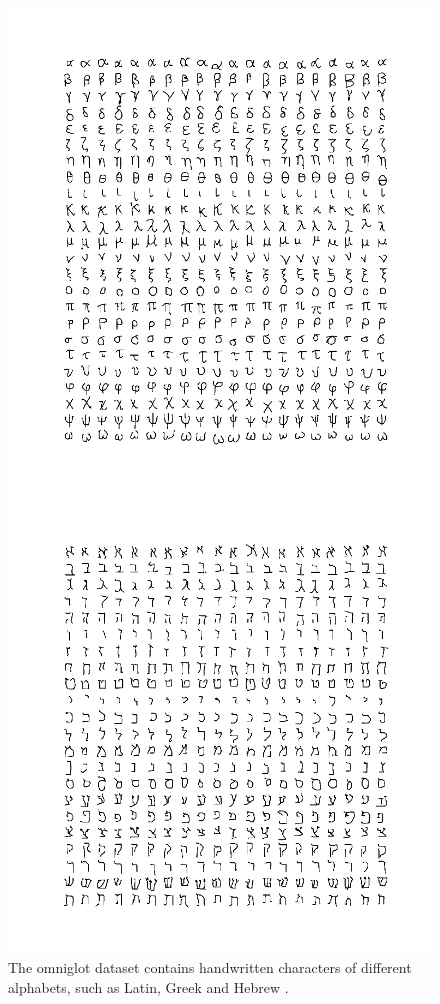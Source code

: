 \begin{figure}[h]
\begin{minipage}{.3\textwidth}
  \includegraphics[width=\linewidth]{images/greek}
\end{minipage}
\begin{minipage}{.3\textwidth}
  \centering
  \includegraphics[width=\linewidth]{images/hebrew}
\end{minipage}
\caption{The omniglot dataset contains handwritten characters of different alphabets, such as Latin, Greek and Hebrew \cite{Lake1332}.}
\label{fig:omniglotcharacters}
\end{figure}

